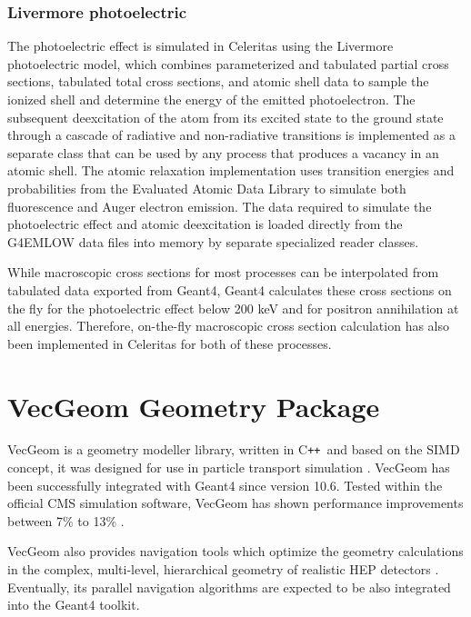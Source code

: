 \documentclass{webofc}
\newcommand{\Cpp}{C\texttt{++}\xspace}
\begin{document}
\subsubsection{Livermore photoelectric}

The photoelectric effect is simulated in Celeritas using the Livermore
photoelectric model, which combines parameterized and tabulated partial cross
sections, tabulated total cross sections, and atomic shell data to sample the
ionized shell and determine the energy of the emitted photoelectron. The
subsequent deexcitation of the atom from its excited state to the ground state
through a cascade of radiative and non-radiative transitions is implemented as
a separate class that can be used by any process that produces a vacancy in an
atomic shell. The atomic relaxation implementation uses transition energies and
probabilities from the Evaluated Atomic Data Library to simulate both
fluorescence and Auger electron emission. The data required to simulate the
photoelectric effect and atomic deexcitation is loaded directly from the
G4EMLOW data files into memory by separate specialized reader classes.

While macroscopic cross sections for most processes can be interpolated from
tabulated data exported from Geant4, Geant4 calculates these cross sections on
the fly for the photoelectric effect below 200 keV and for positron
annihilation at all energies. Therefore, on-the-fly macroscopic cross section
calculation has also been implemented in Celeritas for both of these processes.

\section{VecGeom Geometry Package}
\label{sec:vecgeom}

VecGeom is a geometry modeller library, written in \Cpp\ and based on the SIMD
concept, it was designed for use in particle transport
simulation \cite{VecGeom:web}. VecGeom has been successfully integrated with Geant4
since version 10.6. Tested within the official CMS simulation software, VecGeom
has shown performance improvements between 7\% to 13\% \cite{Pedro:2019mkq}.

VecGeom also provides navigation tools which optimize the geometry calculations
in the complex, multi-level, hierarchical geometry of realistic HEP
detectors \cite{Wenzel:2020zyn}. Eventually, its parallel navigation algorithms
are expected to be also integrated into the Geant4 toolkit.
\end{document}

